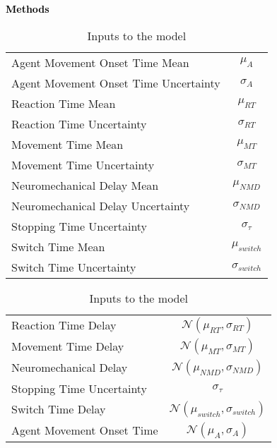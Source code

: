 \documentclass[12pt,letterpaper]{article}
\newcommand{\SethCaption}[2]{\noindent\textbf{\textcolor{black}{#1}} {#2}}
\newcommand{\SectionHeader}[1]{\noindent\textbf{\Large{\textcolor{black}{#1}}}\normalsize }
\begin{document}


\SectionHeader{Methods}
\begin{table}[h]
    \centering
    \begin{tabular}{|l | c|}
        \hline
        Agent Movement Onset Time Mean        & $\mu_{A}$         \\
        Agent Movement Onset Time Uncertainty & $\sigma_{A}$      \\
        Reaction Time Mean                    & $\mu_{RT}$        \\
        Reaction Time Uncertainty             & $\sigma_{RT}$     \\
        Movement Time Mean                    & $\mu_{MT}$        \\
        Movement Time Uncertainty             & $\sigma_{MT}$     \\
        Neuromechanical Delay Mean            & $\mu_{NMD}$       \\
        Neuromechanical Delay Uncertainty     & $\sigma_{NMD}$    \\
        Stopping Time Uncertainty             & $\sigma_{\tau}$   \\
        Switch Time Mean                      & $\mu_{switch}$    \\
        Switch Time Uncertainty               & $\sigma_{switch}$ \\
        \hline
    \end{tabular}
    \caption[]{Inputs to the model}
\end{table}

\begin{table}[h]
    \centering
    \begin{tabular}{|l | c|}
        \hline
        Reaction Time Delay       & $\mathcal{N}(\mu_{RT},\sigma_{RT})$         \\
        Movement Time Delay       & $\mathcal{N}(\mu_{MT},\sigma_{MT})$         \\
        Neuromechanical Delay     & $\mathcal{N}(\mu_{NMD},\sigma_{NMD})$       \\
        Stopping Time Uncertainty & $\sigma_{\tau}$                             \\
        Switch Time Delay         & $\mathcal{N}(\mu_{switch},\sigma_{switch})$ \\
        Agent Movement Onset Time & $\mathcal{N}(\mu_{A},\sigma_{A})$           \\
        \hline
    \end{tabular}
    \caption[]{Inputs to the model}
\end{table}
\end{document}
